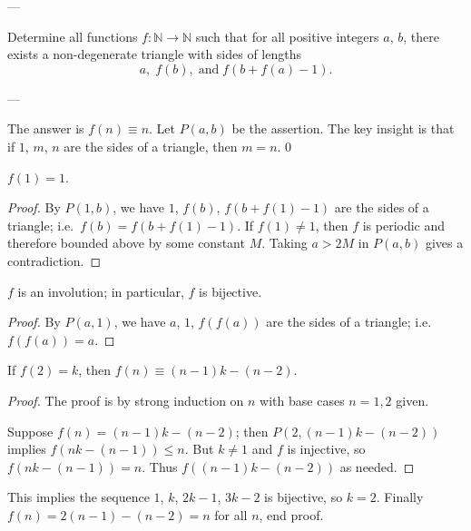 
---

Determine all functions $f:\mathbb N\to\mathbb N$ such that for all positive integers $a$, $b$, there exists a non-degenerate triangle with sides of lengths \[a,\;f(b),\;\text{and}\;f(b+f(a)-1).\]

---

The answer is $f(n)\equiv n$. Let $P(a,b)$ be the assertion. The key insight is that if $1$, $m$, $n$ are the sides of a triangle, then $m=n$.
\setcounter{claim}0
\begin{claim}
    $f(1)=1$.
\end{claim}
\begin{proof}
    By $P(1,b)$, we have $1$, $f(b)$, $f(b+f(1)-1)$ are the sides of a triangle; i.e.\ $f(b)=f(b+f(1)-1)$. If $f(1)\ne1$, then $f$ is periodic and therefore bounded above by some constant $M$. Taking $a>2M$ in $P(a,b)$ gives a contradiction.
\end{proof}
\begin{claim}
    $f$ is an involution; in particular, $f$ is bijective.
\end{claim}
\begin{proof}
    By $P(a,1)$, we have $a$, $1$, $f(f(a))$ are the sides of a triangle; i.e.\ $f(f(a))=a$.
\end{proof}
\begin{claim}
    If $f(2)=k$, then $f(n)\equiv(n-1)k-(n-2)$.
\end{claim}
\begin{proof}
    The proof is by strong induction on $n$ with base cases $n=1,2$ given.

    Suppose $f(n)=(n-1)k-(n-2)$; then $P(2,(n-1)k-(n-2))$ implies $f(nk-(n-1))\le n$. But $k\ne1$ and $f$ is injective, so $f(nk-(n-1))=n$. Thus $f( (n-1)k-(n-2))$ as needed.
\end{proof}

This implies the sequence $1$, $k$, $2k-1$, $3k-2$ is bijective, so $k=2$. Finally $f(n)=2(n-1)-(n-2)=n$ for all $n$, end proof.

